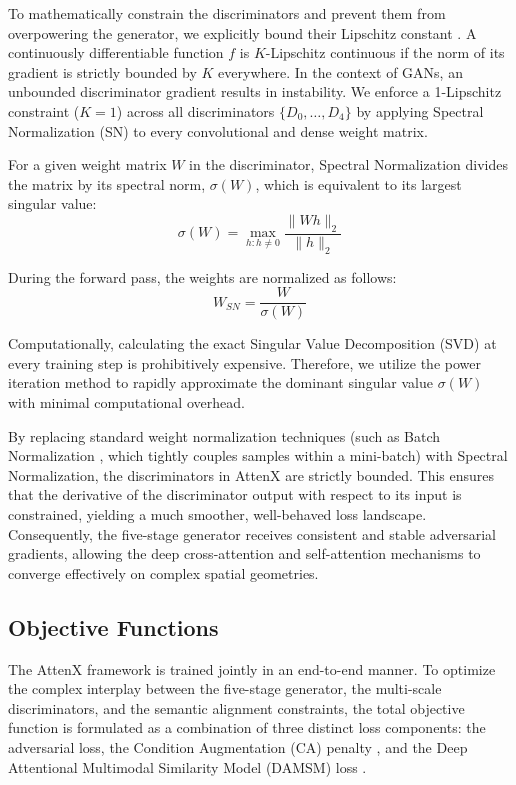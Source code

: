 \documentclass[conference]{IEEEtran}
\begin{document}
To mathematically constrain the discriminators and prevent them from overpowering the generator, we explicitly bound their Lipschitz constant \cite{arjovsky2017wasserstein, miyato2018spectral}. A continuously differentiable function $f$ is $K$-Lipschitz continuous if the norm of its gradient is strictly bounded by $K$ everywhere. In the context of GANs, an unbounded discriminator gradient results in instability. We enforce a 1-Lipschitz constraint ($K=1$) across all discriminators $\{D_0, \dots, D_4\}$ by applying Spectral Normalization (SN) \cite{miyato2018spectral} to every convolutional and dense weight matrix.

For a given weight matrix $W$ in the discriminator, Spectral Normalization divides the matrix by its spectral norm, $\sigma(W)$, which is equivalent to its largest singular value:
\begin{equation}
    \sigma(W) = \max_{h: h \neq 0} \frac{\|W h\|_2}{\|h\|_2}
\end{equation}

During the forward pass, the weights are normalized as follows:
\begin{equation}
    W_{SN} = \frac{W}{\sigma(W)}
\end{equation}

Computationally, calculating the exact Singular Value Decomposition (SVD) at every training step is prohibitively expensive. Therefore, we utilize the power iteration method \cite{miyato2018spectral} to rapidly approximate the dominant singular value $\sigma(W)$ with minimal computational overhead.

By replacing standard weight normalization techniques (such as Batch Normalization \cite{ioffe2015batch}, which tightly couples samples within a mini-batch) with Spectral Normalization, the discriminators in AttenX are strictly bounded. This ensures that the derivative of the discriminator output with respect to its input is constrained, yielding a much smoother, well-behaved loss landscape. Consequently, the five-stage generator receives consistent and stable adversarial gradients, allowing the deep cross-attention and self-attention mechanisms to converge effectively on complex spatial geometries.

\subsection{Objective Functions}

The AttenX framework is trained jointly in an end-to-end manner. To optimize the complex interplay between the five-stage generator, the multi-scale discriminators, and the semantic alignment constraints, the total objective function is formulated as a combination of three distinct loss components: the adversarial loss, the Condition Augmentation (CA) penalty \cite{zhang2018stackgan}, and the Deep Attentional Multimodal Similarity Model (DAMSM) loss \cite{xu2018attngan}.
\end{document}

